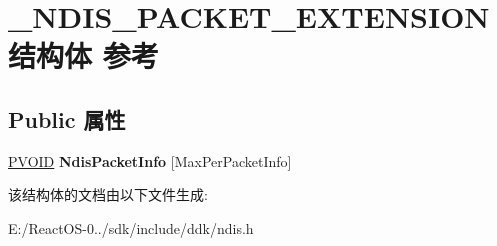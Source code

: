 \hypertarget{struct___n_d_i_s___p_a_c_k_e_t___e_x_t_e_n_s_i_o_n}{}\section{\+\_\+\+N\+D\+I\+S\+\_\+\+P\+A\+C\+K\+E\+T\+\_\+\+E\+X\+T\+E\+N\+S\+I\+O\+N结构体 参考}
\label{struct___n_d_i_s___p_a_c_k_e_t___e_x_t_e_n_s_i_o_n}
\subsection*{Public 属性}
\begin{DoxyCompactItemize}
\item 
\mbox{\label{struct___n_d_i_s___p_a_c_k_e_t___e_x_t_e_n_s_i_o_n_aed6979a988484e1cbcd09308cc2c8122}} 
\hyperlink{interfacevoid}{P\+V\+O\+ID} {\bfseries Ndis\+Packet\+Info} \mbox{[}Max\+Per\+Packet\+Info\mbox{]}
\end{DoxyCompactItemize}


该结构体的文档由以下文件生成\+:\begin{DoxyCompactItemize}
\item 
E\+:/\+React\+O\+S-\/0../sdk/include/ddk/ndis.\+h\end{DoxyCompactItemize}
